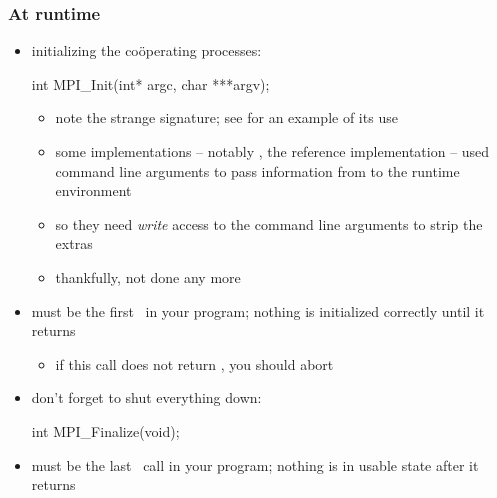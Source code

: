 \begin{frame}[fragile]
%
  \frametitle{At runtime}
%
  \begin{itemize}
%
%
  \item initializing the co\"operating processes:
    \begin{C}
int MPI_Init(int* argc, char ***argv);
    \end{C}
    \begin{itemize}
    \item note the strange signature; see  for an example of its use
    \item some implementations -- notably , the reference implementation --
      used command line arguments to pass information from  to the runtime
      environment
    \item so they need {\em write} access to the command line arguments to strip the extras
    \item thankfully, not done any more
    \end{itemize}
%
  \item must be the first \mpi\ in your program; nothing is initialized correctly until it
    returns
    \begin{itemize}
    \item if this call does not return , you should abort
    \end{itemize}
% 
  \item don't forget to shut everything down:
    \begin{C}
int MPI_Finalize(void);
    \end{C}
%
  \item must be the last \mpi\ call in your program; nothing is in usable state after it
    returns
%
  \end{itemize}
%
\end{frame}


